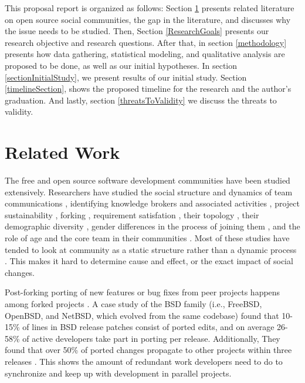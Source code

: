\documentclass[11pt]{report}
\begin{document}
This proposal report is organized as follows: Section \ref{relatedwork} presents related literature on open source social communities, the gap in the literature, and discusses why the issue needs to be studied. 
Then, Section \ref{ResearchGoals} presents our research objective and research questions. After that, in section \ref{methodology} presents how data gathering, statistical modeling, and qualitative analysis are proposed to be done, as well as our initial hypotheses. In section \ref{sectionInitialStudy}, we present results of our initial study. Section \ref{timelineSection}, shows the proposed timeline for the research and the author's graduation. And lastly, section \ref{threatsToValidity} we discuss the threats to validity.\\

\section{Related Work}
\label{relatedwork}

The free and open source software development communities have been studied extensively. Researchers have studied the social structure and dynamics of team communications \cite{Bird}\cite{Guzzi}\cite{HowisonSocialDynamics}\cite{HowisonFlossMole}\cite{Nakakoji}, identifying knowledge brokers and associated activities \cite{Sowe}, project sustainability \cite{Nakakoji}\cite{NymanForkingSustainability}, forking \cite{NymanCodeForking}, requirement satisfation \cite{Ernst}, their topology \cite{Bird}, their demographic diversity \cite{Kunegis}, gender differences in the process of joining them \cite{Kuechler}, and the role of age and the core team in their communities \cite{AzarbakhtOSS2014}\cite{AzarbakhtINSNA2014}\cite{DavidsonVLHCC2014}\cite{Torres}. Most of these studies have tended to look at community as a static structure rather than a dynamic process \cite{CrowstonFLOSSWhatWeKnow}. This makes it hard to determine cause and effect, or the exact impact of social changes.

Post-forking porting of new features or bug fixes from peer projects happens among forked projects \cite{Baishakhi}. A case study of the BSD family (i.e., FreeBSD, OpenBSD, and NetBSD, which evolved from the same codebase) found that 10-15\% of lines in BSD release patches consist of ported edits, and on average 26-58\% of active developers take part in porting per release. Additionally, They found that over 50\% of ported changes propagate to other projects within three releases \cite{Baishakhi}. This shows the amount of redundant work developers need to do to synchronize and keep up with development in parallel projects. 
\end{document}
